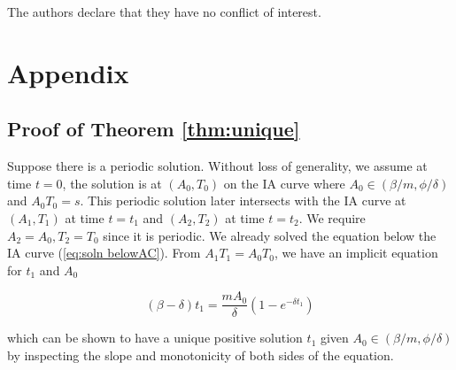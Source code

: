 \documentclass[review,authoryear]{elsarticle}
\begin{document}
The authors declare that they have no conflict of interest.

\section*{Appendix}
\subsection*{Proof of Theorem \ref{thm:unique}}
Suppose there is a periodic solution. Without loss of generality,
we assume at time $t=0$, the solution is at $(A_{0},T_{0})$ on the
IA curve where $A_{0}\in(\beta/m,\phi/\delta)$ and $A_{0}T_{0}=s$.
This periodic solution later intersects with the IA curve at $(A_{1},T_{1})$
at time $t=t_{1}$ and $(A_{2},T_{2})$ at time $t=t_{2}$. We require
$A_{2}=A_{0},T_{2}=T_{0}$ since it is periodic. We already solved
the equation below the IA curve (\ref{eq:soln belowAC}). From $A_{1}T_{1}=A_{0}T_{0}$, we
have an implicit equation for $t_{1}$ and $A_{0}$
\begin{linenomath*}
\begin{equation}
(\beta-\delta)t_{1}=\frac{mA_{0}}{\delta}(1-e^{-\delta t_{1}})\label{eq:A1T1=00003DA0T0}
\end{equation}
\end{linenomath*}
which can be shown to have a unique positive solution $t_{1}$ given $A_{0}\in(\beta/m,\phi/\delta)$ by inspecting the slope and monotonicity of both sides of the equation. 
\end{document}
